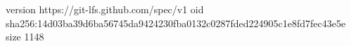 version https://git-lfs.github.com/spec/v1
oid sha256:14d03ba39d6ba56745da9424230fba0132c0287fded224905c1e8fd7fec43e5e
size 1148
